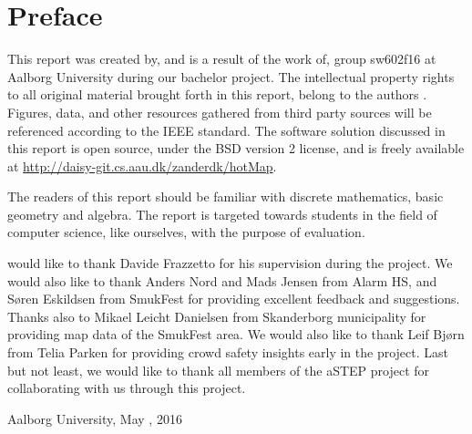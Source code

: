\chapter*{Preface}\label{ch:preface}
This report was created by, and is a result of the work of, group sw602f16 at Aalborg University during our bachelor project. The intellectual property rights to all original material brought forth in this report, belong to the authors . Figures, data, and other resources gathered from third party sources will be referenced according to the IEEE standard. The software solution discussed in this report is open source, under the BSD version 2 license, and is freely available at \url{http://daisy-git.cs.aau.dk/zanderdk/hotMap}.

The readers of this report should be familiar with discrete mathematics, basic geometry and algebra. The report is targeted towards students in the field of computer science, like ourselves, with the purpose of evaluation.

 would like to thank Davide Frazzetto for his supervision during the project. We would also like to thank Anders Nord and Mads Jensen from Alarm HS, and Søren Eskildsen from SmukFest for providing excellent feedback and suggestions. Thanks also to Mikael Leicht Danielsen from Skanderborg municipality for providing map data of the SmukFest area. We would also like to thank Leif Bjørn from Telia Parken for providing crowd safety insights early in the project. Last but not least, we would like to thank all members of the aSTEP project for collaborating with us through this project.

\vspace{\baselineskip}\hfill Aalborg University, May , 2016
\vfill


